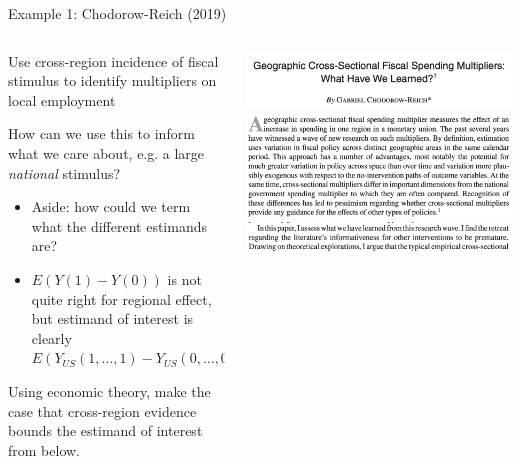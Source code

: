 \documentclass[notes,11pt, aspectratio=169]{beamer}
\newenvironment{wideitemize}{\itemize\addtolength{\itemsep}{10pt}}{\enditemize}
\begin{document}
\begin{frame}{Example 1: Chodorow-Reich (2019)}
\begin{columns}[T] %
  \begin{column}{.5\textwidth}
    \begin{wideitemize}
    \item Use cross-region incidence of fiscal stimulus to identify
      multipliers on local employment
    \item How can we use this to inform what we care about, e.g. a
      large \emph{national} stimulus?
      \begin{itemize}
      \item Aside: how could we term what the different estimands are?
      \item $E(Y(1) - Y(0))$ is not quite right for regional effect,
        but estimand of interest is clearly
        $E(Y_{US}(1,\ldots,1) - Y_{US}(0,\ldots,0))$
      \end{itemize}
    \item Using economic theory, make the case that cross-region evidence
      bounds the estimand of interest from below. 
    \end{wideitemize}
  \end{column}%
  \hfill%
  \begin{column}{.5\textwidth}
    \begin{center}
      \includegraphics[width=\linewidth]{images/chodorowreich1.png}\\
      \includegraphics[width=\linewidth]{images/chodorowreich2.png}\\
      \includegraphics[width=\linewidth]{images/chodorowreich3.png}\\

\end{center}
\end{column}
\end{columns}
\end{frame}
\end{document}
